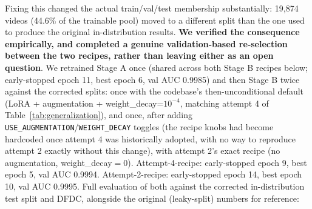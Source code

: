 \documentclass[conference]{IEEEtran}
\begin{document}
Fixing this changed the actual train/val/test membership substantially:
19{,}874 videos (44.6\% of the trainable pool) moved to a different split
than the one used to produce the original in-distribution results.
\textbf{We verified the consequence empirically, and completed a genuine
validation-based re-selection between the two recipes, rather than leaving
either as an open question}. We retrained Stage A once (shared across both
Stage B recipes below; early-stopped epoch 11, best epoch 6, val AUC
0.9985) and then Stage B twice against the corrected splits: once with the
codebase's then-unconditional default (LoRA + augmentation +
weight\_decay=$10^{-4}$, matching attempt 4 of
Table~\ref{tab:generalization}), and once, after adding
\texttt{USE\_AUGMENTATION}/\texttt{WEIGHT\_DECAY} toggles (the recipe
knobs had become hardcoded once attempt 4 was historically adopted, with no
way to reproduce attempt 2 exactly without this change), with attempt 2's
exact recipe (no augmentation, weight\_decay$=0$). Attempt-4-recipe:
early-stopped epoch 9, best epoch 5, val AUC 0.9994. Attempt-2-recipe:
early-stopped epoch 14, best epoch 10, val AUC 0.9995. Full evaluation of
both against the corrected in-distribution test split and DFDC, alongside
the original (leaky-split) numbers for reference:

\begin{table}[t]
\caption{Corrected-split retrains of both recipes vs.\ the original leaky-split runs}
\label{tab:postfix-retrain}
\centering
{}
\end{table}
\end{document}
